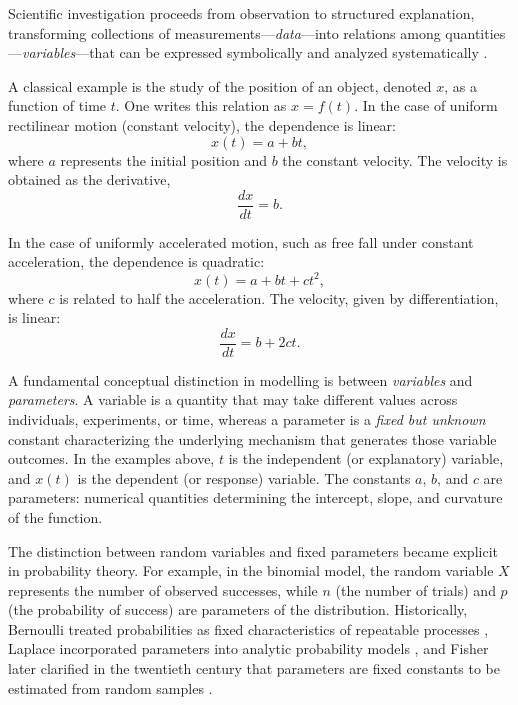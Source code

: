 Scientific investigation proceeds from observation to structured explanation, transforming collections of measurements—\textit{data}—into relations among quantities—\textit{variables}—that can be expressed symbolically and analyzed systematically \cite{hacking_1975_emergence}. 

\medskip 

A classical example is the study of the position of an object, denoted \(x\), as a function of time \(t\). One writes this relation as \(x = f(t)\). In the case of uniform rectilinear motion (constant velocity), the dependence is linear:
\begin{equation}
    x(t) = a + bt ,
    \label{mru_x}
\end{equation}
where \(a\) represents the initial position and \(b\) the constant velocity. The velocity is obtained as the derivative,
\begin{equation}
    \frac{dx}{dt} = b .
    \label{mru_dx}
\end{equation}

\medskip

In the case of uniformly accelerated motion, such as free fall under constant acceleration, the dependence is quadratic:
\begin{equation}
    x(t) = a + bt + ct^{2},
    \label{mrua_x}
\end{equation}
where \(c\) is related to half the acceleration. The velocity, given by differentiation, is linear:
\begin{equation}
    \frac{dx}{dt} = b + 2ct .
    \label{mrua_dx}
\end{equation}

\medskip

A fundamental conceptual distinction in modelling is between \emph{variables} and \emph{parameters}. A variable is a quantity that may take different values across individuals, experiments, or time, whereas a parameter is a \textit{fixed but unknown} constant characterizing the underlying mechanism that generates those variable outcomes. In the examples above, \(t\) is the independent (or explanatory) variable, and \(x(t)\) is the dependent (or response) variable. The constants \(a\), \(b\), and \(c\) are parameters: numerical quantities determining the intercept, slope, and curvature of the function.

\medskip

The distinction between random variables and fixed parameters became explicit in probability theory. For example, in the binomial model, the random variable \(X\) represents the number of observed successes, while \(n\) (the number of trials) and \(p\) (the probability of success) are parameters of the distribution. Historically, Bernoulli treated probabilities as fixed characteristics of repeatable processes \cite{bernoulli_1713_ars}, Laplace incorporated parameters into analytic probability models \cite{laplace_1812_theorie}, and Fisher later clarified in the twentieth century that parameters are fixed constants to be estimated from random samples \cite{fisher_1925_statistical}. 

